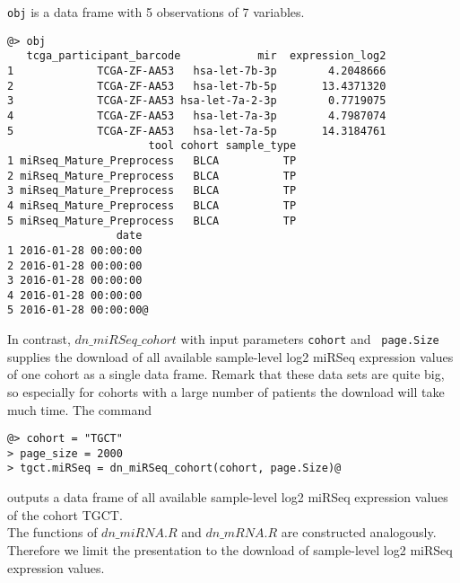 \documentclass{TechReport}
\begin{document}
{\tt obj} is a data frame with 5 observations of 7 variables.
\begin{lstlisting}[style=base]
@> obj
   tcga_participant_barcode            mir  expression_log2
1             TCGA-ZF-AA53   hsa-let-7b-3p        4.2048666
2             TCGA-ZF-AA53   hsa-let-7b-5p       13.4371320
3             TCGA-ZF-AA53 hsa-let-7a-2-3p        0.7719075
4             TCGA-ZF-AA53   hsa-let-7a-3p        4.7987074
5             TCGA-ZF-AA53   hsa-let-7a-5p       14.3184761
                      tool cohort sample_type                              
1 miRseq_Mature_Preprocess   BLCA          TP 
2 miRseq_Mature_Preprocess   BLCA          TP 
3 miRseq_Mature_Preprocess   BLCA          TP 
4 miRseq_Mature_Preprocess   BLCA          TP 
5 miRseq_Mature_Preprocess   BLCA          TP 
                 date
1 2016-01-28 00:00:00
2 2016-01-28 00:00:00
3 2016-01-28 00:00:00
4 2016-01-28 00:00:00
5 2016-01-28 00:00:00@
\end{lstlisting}
In contrast, $dn\_miRSeq\_cohort$ with input parameters {\tt cohort} and {\tt
page.Size} supplies the download of all available sample-level log2 miRSeq
expression 
values of one cohort as a single data frame. 
Remark that these data sets are quite big, so especially for cohorts with a large
number of patients the download will take much time. The command
\begin{lstlisting}[style=base]
@> cohort = "TGCT"
> page_size = 2000
> tgct.miRSeq = dn_miRSeq_cohort(cohort, page.Size)@
\end{lstlisting}
outputs a data frame of all available sample-level log2 miRSeq expression values of
the cohort TGCT. \\
The functions of $dn\_miRNA.R$ and $dn\_mRNA.R$ are constructed analogously.
Therefore we limit the presentation to the download of sample-level 
log2 miRSeq expression values. \\
\end{document}
